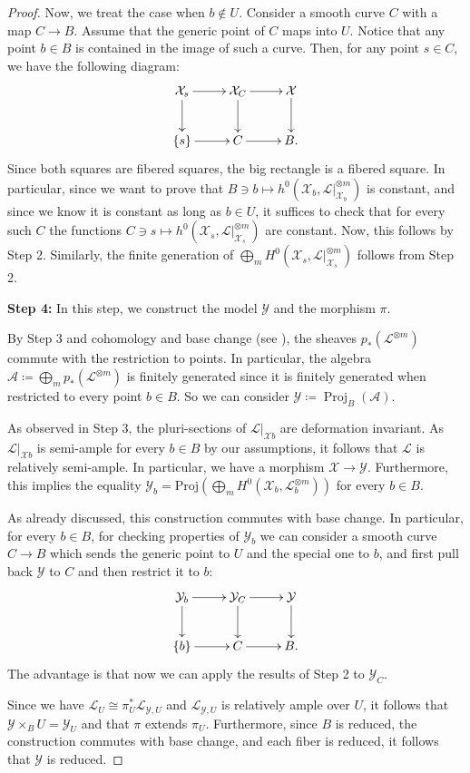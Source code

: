 \documentclass{amsart}
\newcommand{\cA}{\mathcal{A}}
\newcommand{\Proj}{\operatorname{Proj}}
\newcommand{\cL}{\mathcal{L}}
\newcommand{\cX}{\mathcal{X}}
\newcommand{\cY}{\mathcal{Y}}
\theoremstyle{definition}
\newcommand{\rar}{\rightarrow}
\begin{document}
\begin{proof}
Now, we treat the case when $b \not \in U$.
Consider a smooth curve $C$ with a map $C\to B$.
Assume that the generic point of $C$ maps into $U$.
Notice that any point $b \in B$ is contained in the image of such a curve.
Then, for any point $s\in C$, we have the following diagram:
$$\xymatrix{\cX_s\ar[r] \ar[d] & \cX_C \ar[r] \ar[d] & \cX \ar[d] \\ \{s\}\ar[r] & C \ar[r] & B.}$$
Since both squares are fibered squares, the big rectangle is a fibered square.
In particular, since we want to prove that $B\ni b\mapsto h^0(\cX_b,\cL|_{\cX_b}^{\otimes m})$
is constant, and since we know it is constant as long as $b\in U$, it suffices to check that for every such $C$ the functions $C\ni s\mapsto h^0(\cX_s,\cL|_{\cX_s}^{\otimes m})$ are constant.
Now, this follows by Step 2.
Similarly, the finite generation of $\bigoplus_m H^0(\cX_s,\cL|_{\cX_s}^{\otimes m})$ follows from Step 2.


{\bf Step 4:} In this step, we construct the model $\cY$ and the morphism $\pi$.

By Step 3 and cohomology and base change (see \cite{Mum74}), the sheaves $p_*(\cL^{\otimes m})$ commute with the restriction to points. In particular, the algebra $\mathcal{A}  \coloneqq  \bigoplus_{m} p_*(\cL^{\otimes m})$ is finitely generated since it is finitely generated when restricted to every point $b\in B$.
So we can consider $\cY \coloneqq \Proj_B(\cA)$.

As observed in Step 3, the pluri-sections of $\cL|_{\cX b}$ are deformation invariant.
As $\cL|_{\cX b}$ is semi-ample for every $b \in B$ by our assumptions, it follows that $\cL$ is relatively semi-ample.
In particular, we have a morphism $\cX \rar \cY$.
Furthermore, this implies the equality $\cY_b=\mathrm{Proj}(\bigoplus_m H^0(\cX_b,\cL_b^{\otimes m}))$ for every $b \in B$.

As already discussed, this construction commutes with base change.
In particular, for every $b\in B$, for checking properties of $\cY_b$ we can consider a smooth curve $C\to B$ which sends the generic point to $U$ and the special one to $b$, and first pull back $\cY$ to $C$ and then restrict it to $b$:
$$\xymatrix{\cY_b\ar[r] \ar[d] & \cY_C \ar[r] \ar[d] & \cY \ar[d] \\ \{b\}\ar[r] & C \ar[r] & B.}$$
The advantage is that now we can apply the results of Step 2 to $\cY_C$.

Since we have $\cL_U \cong \pi_U^* \cL_{\cY,U}$ and $\cL_{\cY,U}$ is relatively ample over $U$, it follows that $\cY \times_B U = \cY_U$ and that $\pi$ extends $\pi_U$.
Furthermore, since $B$ is reduced, the construction commutes with base change, and each fiber is reduced, it follows that $\cY$ is reduced.


\end{proof}
\end{document}
